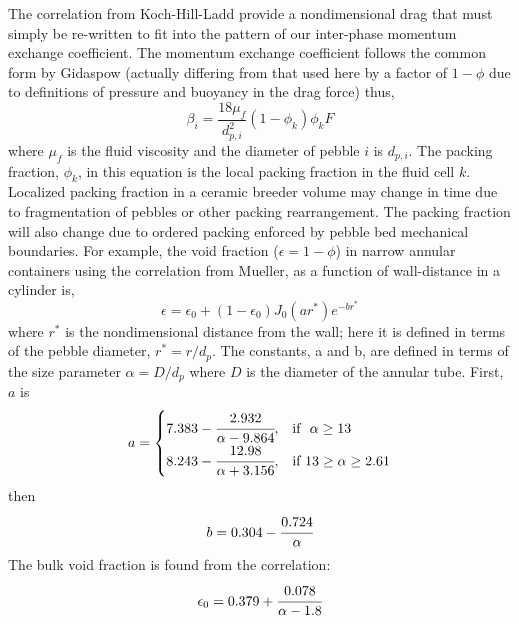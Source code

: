 The correlation from Koch-Hill-Ladd provide a nondimensional drag that must simply be re-written to fit into the pattern of our inter-phase momentum exchange coefficient. The momentum exchange coefficient follows the common form by Gidaspow\cite{gidaspow1994multiphase} (actually differing from that used here by a factor of $1-\phi$ due to definitions of pressure and buoyancy in the drag force) thus,\cite{Hoef2005,Benyahia2006}
\begin{equation}\label{eq:interphase-momentum}
	\beta_{i} = \frac{18\mu_f}{d_{p,i}^2}(1-\phi_k)\phi_k F
\end{equation}
where $\mu_f$ is the fluid viscosity and the diameter of pebble $i$ is $d_{p,i}$. The packing fraction, $\phi_k$, in this equation is the local packing fraction in the fluid cell $k$. Localized packing fraction in a ceramic breeder volume may change in time due to fragmentation of pebbles or other packing rearrangement. The packing fraction will also change due to ordered packing enforced by pebble bed mechanical boundaries.\cite{Hunt1990,Benenati1962,Baird1958} For example, the void fraction ($\epsilon = 1-\phi$) in narrow annular containers using the correlation from Mueller, as a function of wall-distance in a cylinder is,\cite{Mueller1999}
\[
\epsilon = \epsilon_0 + (1-\epsilon_0)J_0(ar^*)e^{-br^*}
\]
where $r^*$ is the nondimensional distance from the wall; here it is defined in terms of the pebble diameter, $r^* = r/d_p$. The constants, a and b, are defined in terms of the size parameter $\alpha = D/d_p$ where $D$ is the diameter of the annular tube. First, $a$ is
\[
    a= 
\begin{cases}
    7.383 - \cfrac{2.932}{\alpha - 9.864}, & \text{if }\  \alpha \geq 13\\
    8.243 - \cfrac{12.98}{\alpha + 3.156}, & \text{if} \ 13 \geq \alpha \geq 2.61
\end{cases}
\]
then
\[
b = 0.304 - \cfrac{0.724}{\alpha}
\]
The bulk void fraction is found from the correlation:
\[
\epsilon_0 = 0.379 + \cfrac{0.078}{\alpha - 1.8}
\]


